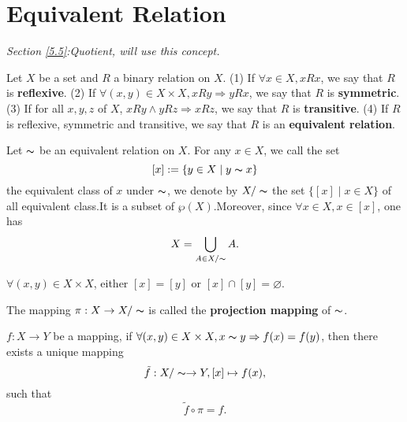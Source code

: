 \section{Equivalent Relation}\label{4.2}
\textit{Section \ref{5.5}:Quotient,  will use this concept.}
\begin{definitionenv}
    Let $X$ be a set and $R$ a binary relation on $X$.
    \newline
    (1) If $\forall x \in X , xRx$,  we say that $R$ is \textbf{reflexive}.
    \newline
    (2) If $\forall (x, y) \in X\times X, xRy\Rightarrow yRx$, we say that $R$ is \textbf{symmetric}.
    \newline
    (3) If for all $x, y, z$ of $X$,  $xRy\wedge yRz\Rightarrow xRz$, we say that $R$ is \textbf{transitive}.
    \newline
    (4) If $R$ is reflexive, symmetric and transitive,  we say that $R$ is an \textbf{equivalent relation}.

\end{definitionenv}
\begin{definitionenv}
    Let $\thicksim$ be an equivalent relation on $X$. For any $x\in X$,  we call the set $$[x]:=\{y\in X\mid y\thicksim x\}$$ the equivalent class of $x$ under $\thicksim$, we denote by $X/\thicksim$ the set $\{[x]\mid x\in X\}$ of all equivalent class.It is a subset of $\wp (X)$.Moreover,  since $\forall x\in X, x\in [x] $,  one has $$X=\bigcup_{A\in X/\thicksim}A.$$
\end{definitionenv}
\begin{propositionenv}
    $\forall (x, y)\in X\times X$,  either $[x]=[y]$ or $[x]\cap [y]=\varnothing$.
\end{propositionenv}
\begin{definitionenv}
    The mapping $\pi :X\rightarrow X/\thicksim$ is called the \textbf{projection mapping} of $\thicksim$.
\end{definitionenv}
\begin{propositionenv}\label{4.2.5}
    $f:X\rightarrow Y$ be a mapping, if $\forall (x, y)\in X\times X, x\thicksim y\Rightarrow f(x)=f(y)$, then there exists a unique mapping$$\tilde{f}:X/\thicksim\rightarrow Y,  [x]\mapsto f(x), $$ such that $$\tilde{f}\circ \pi =f.$$


\begin{center}
\end{center}
\end{propositionenv}

